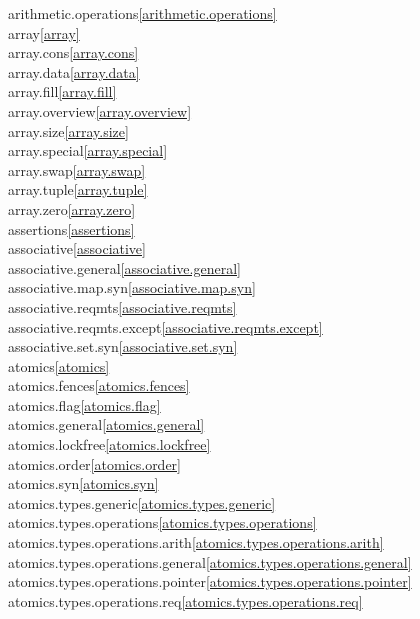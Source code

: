 \begin{multicols}{2}
arithmetic.operations\quad\ref{arithmetic.operations}\\
array\quad\ref{array}\\
array.cons\quad\ref{array.cons}\\
array.data\quad\ref{array.data}\\
array.fill\quad\ref{array.fill}\\
array.overview\quad\ref{array.overview}\\
array.size\quad\ref{array.size}\\
array.special\quad\ref{array.special}\\
array.swap\quad\ref{array.swap}\\
array.tuple\quad\ref{array.tuple}\\
array.zero\quad\ref{array.zero}\\
assertions\quad\ref{assertions}\\
associative\quad\ref{associative}\\
associative.general\quad\ref{associative.general}\\
associative.map.syn\quad\ref{associative.map.syn}\\
associative.reqmts\quad\ref{associative.reqmts}\\
associative.reqmts.except\quad\ref{associative.reqmts.except}\\
associative.set.syn\quad\ref{associative.set.syn}\\
atomics\quad\ref{atomics}\\
atomics.fences\quad\ref{atomics.fences}\\
atomics.flag\quad\ref{atomics.flag}\\
atomics.general\quad\ref{atomics.general}\\
atomics.lockfree\quad\ref{atomics.lockfree}\\
atomics.order\quad\ref{atomics.order}\\
atomics.syn\quad\ref{atomics.syn}\\
atomics.types.generic\quad\ref{atomics.types.generic}\\
atomics.types.operations\quad\ref{atomics.types.operations}\\
atomics.types.operations.arith\quad\ref{atomics.types.operations.arith}\\
atomics.types.operations.general\quad\ref{atomics.types.operations.general}\\
atomics.types.operations.pointer\quad\ref{atomics.types.operations.pointer}\\
atomics.types.operations.req\quad\ref{atomics.types.operations.req}\\

\end{multicols}
